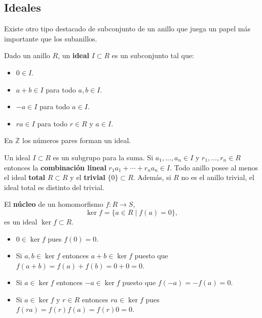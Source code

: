 \hypertarget{ideales}{%
\subsection{Ideales}\label{ideales}}

Existe otro tipo destacado de subconjunto de un anillo que juega un
papel más importante que los subanillos.


Dado un anillo \(R\), un \textbf{ideal} \(I\subset R\) es un subconjunto
tal que:

\begin{itemize}
\item
  \(0\in I\).
\item
  \(a+b\in I\) para todo \(a,b\in I\).
\item
  \(-a\in I\) para todo \(a\in I\).
\item
  \(ra\in I\) para todo \(r\in R\) y \(a\in I\).
\end{itemize}


En \(\mathbb Z\) los números pares forman un ideal.


Un ideal \(I\subset R\) es un subgrupo para la suma. Si
\(a_1,\dots,a_n\in I\) y \(r_1,\dots, r_n\in R\) entonces la
\textbf{combinación lineal} \(r_1a_1+\cdots+r_na_n\in I\). Todo anillo
posee al menos el ideal \textbf{total} \(R\subset R\) y el
\textbf{trivial} \(\{0\}\subset R\). Además, si \(R\) no es el anillo
trivial, el ideal total es distinto del trivial. 


El \textbf{núcleo} de un homomorfismo \(f\colon R\rightarrow S\),
\[\ker f=\{a\in R\;|\;f(a)=0\},\] es un ideal \(\ker f\subset R\).


\begin{itemize}
\item
  \(0\in\ker f\) pues \(f(0)=0\).
\item
  Si \(a,b\in\ker f\) entonces \(a+b\in \ker f\) puesto que
  \(f(a+b)=f(a)+f(b)=0+0=0\).
\item
  Si \(a\in\ker f\) entonces \(-a\in \ker f\) puesto que
  \(f(-a)=-f(a)=0\).
\item
  Si \(a\in\ker f\) y \(r\in R\) entonces \(ra\in \ker f\) pues
  \(f(ra)=f( r )f(a)=f( r )0=0\).
\end{itemize}

